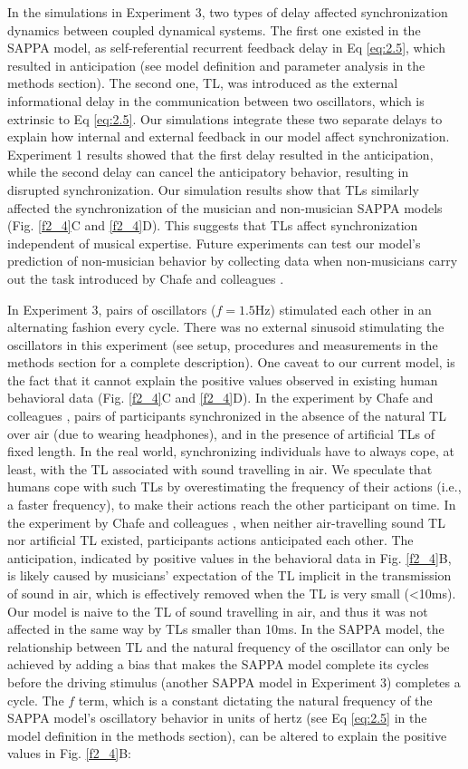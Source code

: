 \documentclass{report}
\begin{document}
In the simulations in Experiment 3, two types of delay affected synchronization dynamics between coupled dynamical systems. The first one existed in the SAPPA model, as self-referential recurrent feedback delay in Eq \eqref{eq:2.5}, which resulted in anticipation (see model definition and parameter analysis in the methods section). The second one, TL, was introduced as the external informational delay in the communication between two oscillators, which is extrinsic to Eq \eqref{eq:2.5}. Our simulations integrate these two separate delays to explain how internal and external feedback in our model affect synchronization. Experiment 1 results showed that the first delay resulted in the anticipation, while the second delay can cancel the anticipatory behavior, resulting in disrupted synchronization. Our simulation results show that TLs similarly affected the synchronization of the musician and non-musician SAPPA models (Fig.{} \ref{f2_4}C and \ref{f2_4}D). This suggests that TLs affect synchronization independent of musical expertise. Future experiments can test our model's prediction of non-musician behavior by collecting data when non-musicians carry out the task introduced by Chafe and colleagues \cite{chafe2010effect}.

In Experiment 3, pairs of oscillators ($f = 1.5$Hz) stimulated each other in an alternating fashion every cycle. There was no external sinusoid stimulating the oscillators in this experiment (see setup, procedures and measurements in the methods section for a complete description). One caveat to our current model, is the fact that it cannot explain the positive values observed in existing human behavioral data (Fig.{} \ref{f2_4}C and \ref{f2_4}D). In the experiment by Chafe and colleagues \cite{chafe2010effect}, pairs of participants synchronized in the absence of the natural TL over air (due to wearing headphones), and in the presence of artificial TLs of fixed length. In the real world, synchronizing individuals have to always cope, at least, with the TL associated with sound travelling in air. We speculate that humans cope with such TLs by overestimating the frequency of their actions (i.e., a faster frequency), to make their actions reach the other participant on time. In the experiment by Chafe and colleagues \cite{chafe2010effect}, when neither air-travelling sound TL nor artificial TL existed, participants actions anticipated each other. The anticipation, indicated by positive values in the behavioral data in Fig.{} \ref{f2_4}B, is likely caused by musicians' expectation of the TL implicit in the transmission of sound in air, which is effectively removed when the TL is very small (<10ms). Our model is naive to the TL of sound travelling in air, and thus it was not affected in the same way by TLs smaller than 10ms. In the SAPPA model, the relationship between TL and the natural frequency of the oscillator can only be achieved by adding a bias that makes the SAPPA model complete its cycles before the driving stimulus (another SAPPA model in Experiment 3) completes a cycle. The $f$ term, which is a constant dictating the natural frequency of the SAPPA model's oscillatory behavior in units of hertz (see Eq \eqref{eq:2.5} in the model definition in the methods section), can be altered to explain the positive values in Fig.{} \ref{f2_4}B:  
\end{document}
